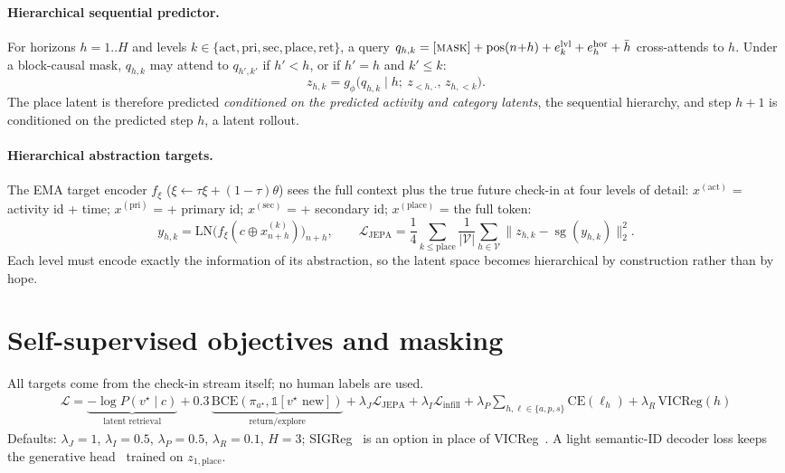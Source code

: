 \documentclass[10.5pt]{article}
\newcommand{\sg}{\operatorname{sg}}
\begin{document}
\paragraph{Hierarchical sequential predictor.} For horizons $h=1..H$ and levels
$k\in\{\text{act},\text{pri},\text{sec},\text{place},\text{ret}\}$, a query
$q_{h,k}=[\textsc{mask}]+\mathrm{pos}(n{+}h)+e^{\mathrm{lvl}}_k+e^{\mathrm{hor}}_h+\bar h$ cross-attends to $h$. Under a
block-causal mask, $q_{h,k}$ may attend to $q_{h',k'}$ if $h'<h$, or if $h'=h$ and $k'\le k$:
\begin{equation}
z_{h,k}=g_\phi\big(q_{h,k}\mid h;\ z_{<h,\cdot},\,z_{h,<k}\big).
\end{equation}
The place latent is therefore predicted \emph{conditioned on the predicted activity and category latents}, the
sequential hierarchy, and step $h{+}1$ is conditioned on the predicted step $h$, a latent rollout.

\paragraph{Hierarchical abstraction targets.} The EMA target encoder $f_\xi$ ($\xi\leftarrow\tau\xi+(1-\tau)\theta$)
sees the full context plus the true future check-in at four levels of detail: $x^{(\text{act})}$ = activity id + time;
$x^{(\text{pri})}$ = + primary id; $x^{(\text{sec})}$ = + secondary id; $x^{(\text{place})}$ = the full token:
\begin{equation}
y_{h,k}=\mathrm{LN}\big(f_\xi(c\oplus x^{(k)}_{n+h})\big)_{n+h},\qquad
\mathcal{L}_{\mathrm{JEPA}}=\frac{1}{4}\sum_{k\le\text{place}}\frac{1}{|\mathcal V|}\sum_{h\in\mathcal V}\|z_{h,k}-\sg(y_{h,k})\|_2^2 .
\end{equation}
Each level must encode exactly the information of its abstraction, so the latent space becomes hierarchical by
construction rather than by hope.

\section{Self-supervised objectives and masking}\label{sec:ssl}
All targets come from the check-in stream itself; no human labels are used.
\begin{align}
\mathcal{L}=\underbrace{-\log P(v^\star\mid c)}_{\text{latent retrieval}}
+0.3\,\underbrace{\mathrm{BCE}(\pi_{a^\star},\mathbb 1[v^\star\text{ new}])}_{\text{return/explore}}
+\lambda_J\mathcal{L}_{\mathrm{JEPA}}+\lambda_I\mathcal{L}_{\mathrm{infill}}
+\lambda_P\!\!\sum_{h,\ell\in\{a,p,s\}}\!\!\mathrm{CE}(\ell_{h})+\lambda_R\,\mathrm{VICReg}(h)
\end{align}
Defaults: $\lambda_J{=}1$, $\lambda_I{=}0.5$, $\lambda_P{=}0.5$, $\lambda_R{=}0.1$, $H{=}3$; SIGReg~\cite{lejepa} is an option
in place of VICReg~\cite{vicreg}. A light semantic-ID decoder loss keeps the generative head~\cite{tiger} trained on
$z_{1,\mathrm{place}}$.
\end{document}
